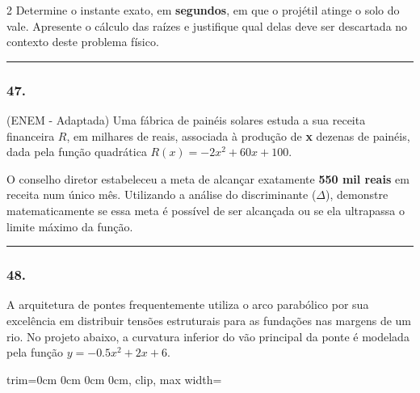 \documentclass[twoside, 10pt, a4paper]{article}
\newlength{\espacoPreQuestao}
\newlength{\espacoQuestao}
\begin{document}
\begin{multicols*}{2}
Determine o instante exato, em \textbf{segundos}, em que o projétil atinge o solo do vale. Apresente o cálculo das raízes e justifique qual delas deve ser descartada no contexto deste problema físico.
\par\vspace{\espacoQuestao}

\noindent\textcolor{CorLinha}{\rule{\linewidth}{0.5pt}} 
\par\vspace{\espacoPreQuestao}
\subsubsection*{47.} (ENEM - Adaptada) Uma fábrica de painéis solares estuda a sua receita financeira $R$, em milhares de reais, associada à produção de \textbf{x} dezenas de painéis, dada pela função quadrática $R(x) = -2x^2 + 60x + 100$.

O conselho diretor estabeleceu a meta de alcançar exatamente \textbf{550 mil reais} em receita num único mês. Utilizando a análise do discriminante ($\Delta$), demonstre matematicamente se essa meta é possível de ser alcançada ou se ela ultrapassa o limite máximo da função.
\par\vspace{\espacoQuestao}

\noindent\textcolor{CorLinha}{\rule{\linewidth}{0.5pt}} 
\par\vspace{\espacoPreQuestao}
\subsubsection*{48.} A arquitetura de pontes frequentemente utiliza o arco parabólico por sua excelência em distribuir tensões estruturais para as fundações nas margens de um rio. No projeto abaixo, a curvatura inferior do vão principal da ponte é modelada pela função $y = -0.5x^2 + 2x + 6$.

\begin{center}
\begin{adjustbox}{trim=0cm 0cm 0cm 0cm, clip, max width=\linewidth}
\end{adjustbox}
\end{center}
\end{multicols*}
\end{document}
